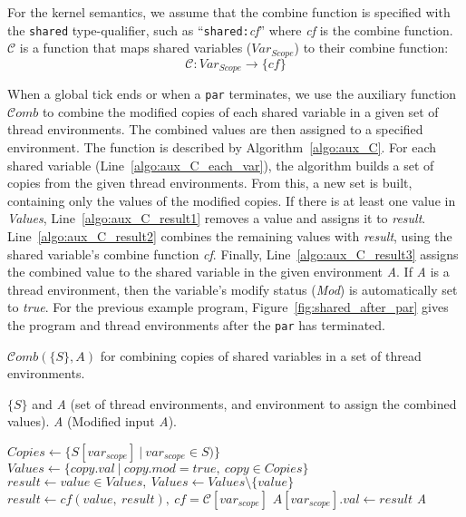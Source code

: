 For the kernel semantics, we assume that the combine function 
is specified with the \verb$shared$ type-qualifier, such as 
``\verb$shared:$\emph{cf}'' where \emph{cf} is the combine function. 
$\mathcal{C}$ is a function that maps shared variables ($Var_{Scope}$) 
to their combine function:
\begin{equation*}
	\mathcal{C}: Var_{Scope} \to \{cf\}
\end{equation*}

When a global tick ends or when a \verb$par$ terminates, we use 
the auxiliary function $\mathcal{C}omb$ to combine the modified 
copies of each shared variable in a given set of thread environments. 
The combined values are then assigned to a specified environment. 
The function is described by Algorithm~\ref{algo:aux_C}. 
For each shared variable (Line~\ref{algo:aux_C_each_var}), the algorithm 
builds a set of copies from the given thread environments. 
From this, a new set is built, containing only the values of 
the modified copies. If there is at least one value in \emph{Values}, 
Line~\ref{algo:aux_C_result1} removes a value and assigns it to \emph{result}. 
Line~\ref{algo:aux_C_result2} combines the remaining values with 
\emph{result}, using the shared variable's combine function \emph{cf}. 
Finally, Line~\ref{algo:aux_C_result3} assigns the combined value to 
the shared variable in the given environment \emph{A}. If \emph{A}
is a thread environment, then the variable's modify status (\emph{Mod})
is automatically set to \emph{true}. For the previous example
program, Figure~\ref{fig:shared_after_par} gives the program and thread 
environments after the \verb$par$ has terminated.

\begin{algorithm}[t]
	\caption{$\mathcal{C}omb(\{S\}, A)$ for combining copies of shared variables in a set of thread environments.}
	\label{algo:aux_C}

	\begin{algorithmic}[1]
		\Require $\{S\}$ and \emph{A} (set of thread environments, and environment to assign the combined values).
		\Ensure \emph{A} (Modified input \emph{A}).

			\label{algo:aux_C_each_var}
			\State $Copies \gets \{S[var_{scope}]~|~var_{scope} \in S)\}$
			\State $Values \gets \{copy.val~|~copy.mod = true,~copy \in Copies\}$
				\State $result \gets value \in Values,~Values \gets Values \setminus \{value\}$ \label{algo:aux_C_result1}
					\State $result \gets cf(value,~result),~cf = \mathcal{C}[var_{scope}]$ \label{algo:aux_C_result2}
				\EndFor
				\State $A[var_{scope}].val \gets result$ \label{algo:aux_C_result3}
			\EndIf
		\EndFor
		\State \Return \emph{A}
	\end{algorithmic}
\end{algorithm}

